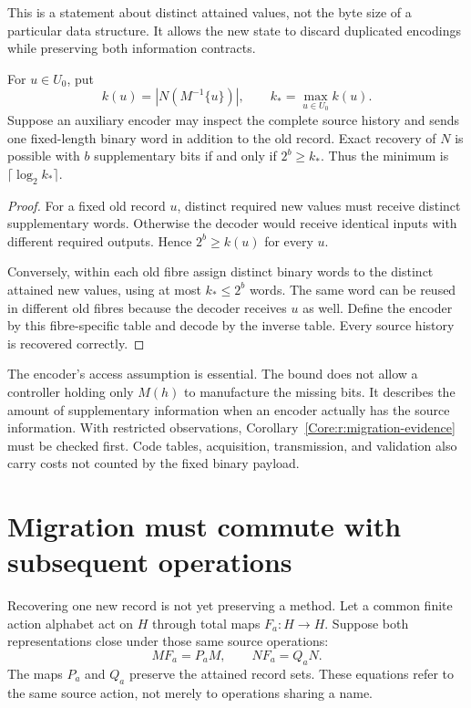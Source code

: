 This is a statement about distinct attained values, not the byte size of a particular data structure. It allows the new state to discard duplicated encodings while preserving both information contracts.

\begin{Coretheorem}\label{Core:r:migration-bits}
For $u\in U_0$, put
\[
 k(u)=|N(M^{-1}\{u\})|,\qquad k_* =\max_{u\in U_0}k(u).
\]
Suppose an auxiliary encoder may inspect the complete source history and sends one fixed-length binary word in addition to the old record. Exact recovery of $N$ is possible with $b$ supplementary bits if and only if $2^b\ge k_*$. Thus the minimum is $\lceil\log_2 k_*\rceil$.
\end{Coretheorem}
\begin{proof}
For a fixed old record $u$, distinct required new values must receive distinct supplementary words. Otherwise the decoder would receive identical inputs with different required outputs. Hence $2^b\ge k(u)$ for every $u$.

Conversely, within each old fibre assign distinct binary words to the distinct attained new values, using at most $k_*\le 2^b$ words. The same word can be reused in different old fibres because the decoder receives $u$ as well. Define the encoder by this fibre-specific table and decode by the inverse table. Every source history is recovered correctly.
\end{proof}

The encoder's access assumption is essential. The bound does not allow a controller holding only $M(h)$ to manufacture the missing bits. It describes the amount of supplementary information when an encoder actually has the source information. With restricted observations, Corollary~\ref{Core:r:migration-evidence} must be checked first. Code tables, acquisition, transmission, and validation also carry costs not counted by the fixed binary payload.

\section{Migration must commute with subsequent operations}
Recovering one new record is not yet preserving a method. Let a common finite action alphabet act on $H$ through total maps $F_a:H\to H$. Suppose both representations close under those same source operations:
\[
 M F_a=P_a M,\qquad N F_a=Q_a N.
\]
The maps $P_a$ and $Q_a$ preserve the attained record sets. These equations refer to the same source action, not merely to operations sharing a name.

